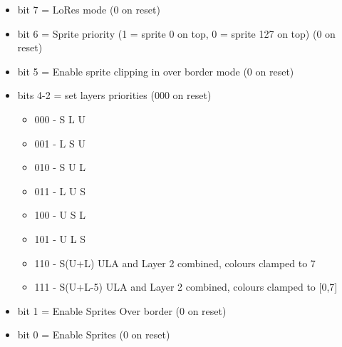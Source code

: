\begin{itemize}
\item bit 7 = LoRes mode (0 on reset)
\item bit 6 = Sprite priority (1 = sprite 0 on top, 0 = sprite 127 on
  top) (0 on reset)
\item bit 5 = Enable sprite clipping in over border mode (0 on reset)
\item bits 4-2 = set layers priorities (000 on reset)
  \begin{itemize}
  \item 000 - S L U
  \item 001 - L S U
  \item 010 - S U L
  \item 011 - L U S
  \item 100 - U S L
  \item 101 - U L S
  \item 110 - S(U+L) ULA and Layer 2 combined, colours clamped to 7
  \item 111 - S(U+L-5) ULA and Layer 2 combined, colours clamped to [0,7]
  \end{itemize}
\item bit 1 = Enable Sprites Over border (0 on reset)
\item bit 0 = Enable Sprites (0 on reset)
\end{itemize}


